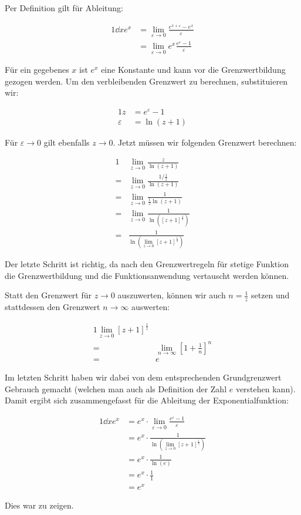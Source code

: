 \item Per Definition gilt für Ableitung:

\begin{alignat*}{1}
	\dd{}{x}e^x &= \lim\limits_{\varepsilon\to 0} \frac{e^{x+\varepsilon}-e^x}{\varepsilon}\\
	            &= \lim\limits_{\varepsilon\to 0} e^x \frac{e^\varepsilon -1}{\varepsilon}
\end{alignat*}

Für ein gegebenes $x$ ist $e^x$ eine Konstante und kann vor die Grenzwertbildung gezogen werden. Um den verbleibenden Grenzwert zu berechnen, substituieren wir:

\begin{alignat*}{1}
	z &= e^\varepsilon - 1 \\
	\varepsilon &= \ln(z+1)
\end{alignat*}

Für $\varepsilon \to 0$ gilt ebenfalls $z \to 0$. Jetzt müssen wir folgenden Grenzwert berechnen:

\begin{alignat*}{1}
	  & \lim\limits_{z\to 0} \frac{z}{\ln(z+1)} \\
	= & \lim\limits_{z\to 0} \frac{1/\frac{1}{z}}{\ln(z+1)} \\
	= & \lim\limits_{z\to 0} \frac{1}{\frac{1}{z}\ln(z+1)} \\
	= & \lim\limits_{z\to 0} \frac{1}{\ln([z+1]^\frac{1}{z})} \\
	= & \frac{1}{\ln(\lim\limits_{z\to 0}[z+1]^\frac{1}{z})}
\end{alignat*}

Der letzte Schritt ist richtig, da nach den Grenzwertregeln für stetige Funktion die Grenzwertbildung und die Funktionsanwendung vertauscht werden können.

Statt den Grenzwert für $z\to 0$ auszuwerten, können wir auch $n=\frac{1}{z}$ setzen und stattdessen den Grenzwert $n\to\infty$ auswerten:

\begin{alignat*}{1}
	    \lim\limits_{z\to 0}[z+1]^\frac{1}{z} \\
	= & \lim\limits_{n \to \infty}[1+\frac{1}{n}]^n \\
	= & e
\end{alignat*}
	
Im letzten Schritt haben wir dabei von dem entsprechenden Grundgrenzwert Gebrauch gemacht (welchen man auch als Definition der Zahl $e$ verstehen kann). Damit ergibt sich  zusammengefasst für die Ableitung der Exponentialfunktion:

\begin{alignat*}{1}
	\dd{}{x}e^x &= e^x \cdot \lim\limits_{\varepsilon\to 0} \frac{e^\varepsilon -1}{\varepsilon} \\ 
	            &= e^x \cdot \frac{1}{\ln(\lim\limits_{z\to 0}[z+1]^\frac{1}{z})} \\
	            &= e^x \cdot \frac{1}{\ln(e)} \\
	            &= e^x \cdot \frac{1}{1} \\
	            &= e^x
\end{alignat*}
	
Dies war zu zeigen.
